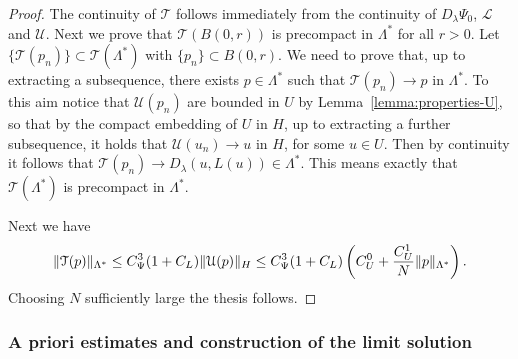 \documentclass[a4paper,10pt,oneside]{amsbook}
\numberwithin{section}{chapter}
\numberwithin{equation}{chapter}
\theoremstyle{definition}
\DeclarePairedDelimiter{\norm}{\lVert}{\rVert}
\begin{document}
\begin{proof}
The continuity of $\mathcal{T}$ follows immediately from the continuity of $D_\lambda\Psi_0$, $\mathcal{L}$ and $\mathcal{U}$. Next we prove that $\mathcal{T}(B(0,r))$ is precompact in $\Lambda^*$ for all $r>0$. Let $\{\mathcal{T}(p_n)\}\subset\mathcal{T}(\Lambda^*)$ with $\{p_n\}\subset B(0,r)$. We need to prove that, up to extracting a subsequence, there exists $p\in\Lambda^*$ such that $\mathcal{T}(p_n)\to p$ in $\Lambda^*$. To this aim notice that $\mathcal{U}(p_n)$ are bounded in $U$ by Lemma~\ref{lemma:properties-U}, so that by the compact embedding of $U$ in $H$, up to extracting a further subsequence, it holds that $\mathcal{U}(u_n)\to u$ in $H$, for some $u\in U$. Then by continuity it follows that $\mathcal{T}(p_n)\to D_\lambda(u,L(u))\in\Lambda^*$. This means exactly that $\mathcal{T}(\Lambda^*)$ is precompact in $\Lambda^*$.

Next we have
\[
\norm{\mathcal{T}(p)}_{\Lambda^*}\le C_\Psi^3(1+C_L)\norm{\mathcal{U}(p)}_H\le C_\Psi^3(1+C_L)\left(C_U^0+\frac{C_U^1}{N}\norm{p}_{\Lambda^*}\right).
\]
Choosing $N$ sufficiently large the thesis follows.
\end{proof}

\subsubsection*{A priori estimates and construction of the limit solution}
\end{document}
